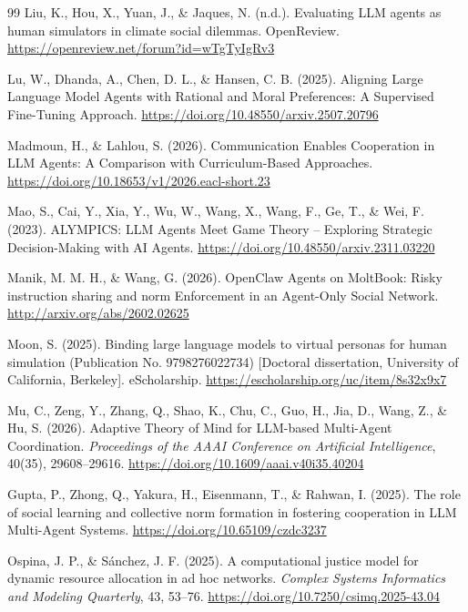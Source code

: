 \documentclass[12pt,letterpaper]{article}
\begin{document}
\begin{thebibliography}{99}
Liu, K., Hou, X., Yuan, J., \& Jaques, N. (n.d.). Evaluating LLM agents as human simulators in climate social dilemmas. OpenReview. \url{https://openreview.net/forum?id=wTgTyIgRv3}

Lu, W., Dhanda, A., Chen, D. L., \& Hansen, C. B. (2025). Aligning Large Language Model Agents with Rational and Moral Preferences: A Supervised Fine-Tuning Approach. \url{https://doi.org/10.48550/arxiv.2507.20796}

Madmoun, H., \& Lahlou, S. (2026). Communication Enables Cooperation in LLM Agents: A Comparison with Curriculum-Based Approaches. \url{https://doi.org/10.18653/v1/2026.eacl-short.23}

Mao, S., Cai, Y., Xia, Y., Wu, W., Wang, X., Wang, F., Ge, T., \& Wei, F. (2023). ALYMPICS: LLM Agents Meet Game Theory -- Exploring Strategic Decision-Making with AI Agents. \url{https://doi.org/10.48550/arxiv.2311.03220}

Manik, M. M. H., \& Wang, G. (2026). OpenClaw Agents on MoltBook: Risky instruction sharing and norm Enforcement in an Agent-Only Social Network. \url{http://arxiv.org/abs/2602.02625}

Moon, S. (2025). Binding large language models to virtual personas for human simulation (Publication No. 9798276022734) [Doctoral dissertation, University of California, Berkeley]. eScholarship. \url{https://escholarship.org/uc/item/8s32x9x7}

Mu, C., Zeng, Y., Zhang, Q., Shao, K., Chu, C., Guo, H., Jia, D., Wang, Z., \& Hu, S. (2026). Adaptive Theory of Mind for LLM-based Multi-Agent Coordination. \textit{Proceedings of the AAAI Conference on Artificial Intelligence}, 40(35), 29608--29616. \url{https://doi.org/10.1609/aaai.v40i35.40204}

Gupta, P., Zhong, Q., Yakura, H., Eisenmann, T., \& Rahwan, I. (2025). The role of social learning and collective norm formation in fostering cooperation in LLM Multi-Agent Systems. \url{https://doi.org/10.65109/czdc3237}

Ospina, J. P., \& S\'anchez, J. F. (2025). A computational justice model for dynamic resource allocation in ad hoc networks. \textit{Complex Systems Informatics and Modeling Quarterly}, 43, 53--76. \url{https://doi.org/10.7250/csimq.2025-43.04}


\end{thebibliography}
\end{document}
